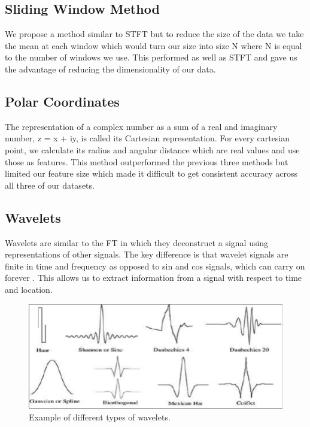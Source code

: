 \documentclass{turabian-thesis}
\begin{document}
\subsection{Sliding Window Method}

We propose a method similar to STFT but to reduce the size of the data we take the mean at each window which would turn our size into size N where N is equal to the number of windows we use. This performed as well as STFT and gave us the advantage of reducing the dimensionality of our data. 

\subsection{Polar Coordinates}

The representation of a complex number as a sum of a real and imaginary number, z = x + iy, is called its Cartesian representation. For every cartesian point, we calculate its radius and angular distance which are real values and use those as features. This method outperformed the previous three methods but limited our feature size which made it difficult to get consistent accuracy across all three of our datasets.

\subsection{Wavelets}

Wavelets are similar to the FT in which they deconstruct a signal using representations of other signals. The key difference is that wavelet signals are finite in time and frequency as opposed to sin and cos signals, which can carry on forever \cite{strang_wavelets_1996}. This allows us to extract information from a signal with respect to time and location.


\begin{figure}[h!]
   \begin{center}
      \includegraphics[scale=0.4]{../media/wavelet_families.png}
   \end{center}
   \caption{Example of different types of wavelets.}
   \label{fig:reinforcementAgent}
\end{figure}
\end{document}
